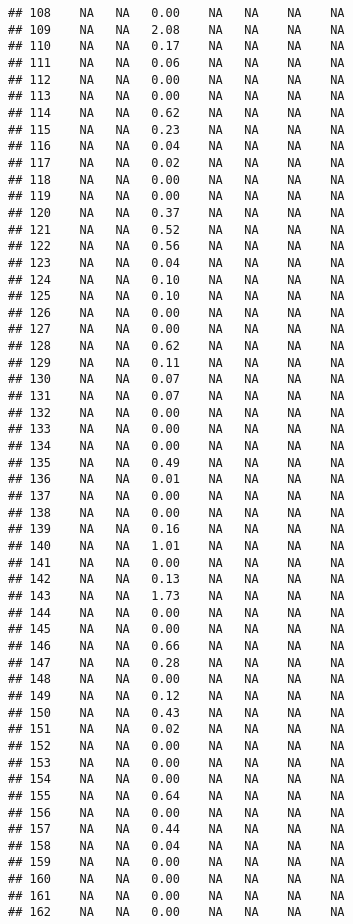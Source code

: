 \documentclass{article}\usepackage{graphicx, color}
\makeatletter
\newenvironment{kframe}{%
 \def\at@end@of@kframe{}%
 \ifinner\ifhmode%
  \def\at@end@of@kframe{\end{minipage}}%
  \begin{minipage}{\columnwidth}%
 \fi\fi%
 \def\FrameCommand##1{\hskip\@totalleftmargin \hskip-\fboxsep
 \colorbox{shadecolor}{##1}\hskip-\fboxsep
     \hskip-\linewidth \hskip-\@totalleftmargin \hskip\columnwidth}%
 \MakeFramed {\advance\hsize-\width
   \@totalleftmargin\z@ \linewidth\hsize
   \@setminipage}}%
 {\par\unskip\endMakeFramed%
 \at@end@of@kframe}
\newenvironment{knitrout}{}{} %
\makeatother
\begin{document}
\begin{knitrout}
\begin{kframe}
\begin{verbatim}
## 108    NA   NA   0.00    NA   NA    NA    NA
## 109    NA   NA   2.08    NA   NA    NA    NA
## 110    NA   NA   0.17    NA   NA    NA    NA
## 111    NA   NA   0.06    NA   NA    NA    NA
## 112    NA   NA   0.00    NA   NA    NA    NA
## 113    NA   NA   0.00    NA   NA    NA    NA
## 114    NA   NA   0.62    NA   NA    NA    NA
## 115    NA   NA   0.23    NA   NA    NA    NA
## 116    NA   NA   0.04    NA   NA    NA    NA
## 117    NA   NA   0.02    NA   NA    NA    NA
## 118    NA   NA   0.00    NA   NA    NA    NA
## 119    NA   NA   0.00    NA   NA    NA    NA
## 120    NA   NA   0.37    NA   NA    NA    NA
## 121    NA   NA   0.52    NA   NA    NA    NA
## 122    NA   NA   0.56    NA   NA    NA    NA
## 123    NA   NA   0.04    NA   NA    NA    NA
## 124    NA   NA   0.10    NA   NA    NA    NA
## 125    NA   NA   0.10    NA   NA    NA    NA
## 126    NA   NA   0.00    NA   NA    NA    NA
## 127    NA   NA   0.00    NA   NA    NA    NA
## 128    NA   NA   0.62    NA   NA    NA    NA
## 129    NA   NA   0.11    NA   NA    NA    NA
## 130    NA   NA   0.07    NA   NA    NA    NA
## 131    NA   NA   0.07    NA   NA    NA    NA
## 132    NA   NA   0.00    NA   NA    NA    NA
## 133    NA   NA   0.00    NA   NA    NA    NA
## 134    NA   NA   0.00    NA   NA    NA    NA
## 135    NA   NA   0.49    NA   NA    NA    NA
## 136    NA   NA   0.01    NA   NA    NA    NA
## 137    NA   NA   0.00    NA   NA    NA    NA
## 138    NA   NA   0.00    NA   NA    NA    NA
## 139    NA   NA   0.16    NA   NA    NA    NA
## 140    NA   NA   1.01    NA   NA    NA    NA
## 141    NA   NA   0.00    NA   NA    NA    NA
## 142    NA   NA   0.13    NA   NA    NA    NA
## 143    NA   NA   1.73    NA   NA    NA    NA
## 144    NA   NA   0.00    NA   NA    NA    NA
## 145    NA   NA   0.00    NA   NA    NA    NA
## 146    NA   NA   0.66    NA   NA    NA    NA
## 147    NA   NA   0.28    NA   NA    NA    NA
## 148    NA   NA   0.00    NA   NA    NA    NA
## 149    NA   NA   0.12    NA   NA    NA    NA
## 150    NA   NA   0.43    NA   NA    NA    NA
## 151    NA   NA   0.02    NA   NA    NA    NA
## 152    NA   NA   0.00    NA   NA    NA    NA
## 153    NA   NA   0.00    NA   NA    NA    NA
## 154    NA   NA   0.00    NA   NA    NA    NA
## 155    NA   NA   0.64    NA   NA    NA    NA
## 156    NA   NA   0.00    NA   NA    NA    NA
## 157    NA   NA   0.44    NA   NA    NA    NA
## 158    NA   NA   0.04    NA   NA    NA    NA
## 159    NA   NA   0.00    NA   NA    NA    NA
## 160    NA   NA   0.00    NA   NA    NA    NA
## 161    NA   NA   0.00    NA   NA    NA    NA
## 162    NA   NA   0.00    NA   NA    NA    NA

\end{verbatim}
\end{kframe}
\end{knitrout}
\end{document}
